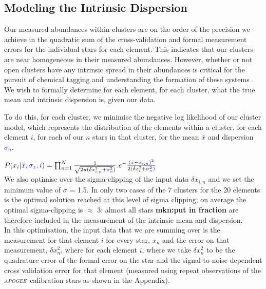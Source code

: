 \documentclass[14pt, preprint2]{aastex6}
\newcommand{\project}[1]{\textsl{#1}}
\newcommand{\apogee}{\project{\textsc{apogee}}}
\begin{document}
\subsection{Modeling the Intrinsic Dispersion}

Our measured abundances within clusters are on the order of the precision we achieve in the quadratic sum of the cross-validation and formal measurement errors for the individual stars for each element. This indicates that our clusters are near homogeneous in their measured abundances. However, whether or not open clusters have any intrinsic spread in their abundances is critical for the pursuit of chemical tagging and understanding the formation of these systems \citep[][]{Bovy2016, Lui2016}. We wish to formally determine for each element, for each cluster, what the true mean and intrinsic dispersion is, given our data. 

To do this, for each cluster, we minimise the negative log likelihood of our cluster model, which represents the distribution of the elements within a cluster, for each element $i$, for each of our $n$ stars in that cluster, for the mean \textcolor{blue}{$\bar{x}$} and dispersion \textcolor{blue}{$\sigma_n$}. 

$P({x_i} | \textcolor{blue}{\bar{x}, \sigma_x, i }) =  \prod_{n=1}^{N} \frac{1}{\sqrt{2 \pi (\delta x_{ \textcolor{blue}{i}, n} ^2 + \textcolor{blue}{{\sigma}_n^2}})} . e ^ - {\frac{\textcolor{blue}{(\bar{x}} - x_{\textcolor{blue}{i}, n})^2 }{2(\delta x_i^2 + \textcolor{blue}{\sigma_n^2)}}}$ \\

We also optimise over the sigma-clipping of the input data $\delta x_{i, n}$ and we set the minimum value of $\sigma$ = 1.5. In only two cases of the 7 clusters for the 20 elements is the optimal solution reached at this level of sigma clipping; on average the optimal sigma-clipping is $\approx$ 3: almost all stars \textbf{mkn:put in fraction} are therefore included in the measurement of the intrinsic mean and dispersion.\\



In this optimisation, the input data that we are summing over is the measurement for that element $i$ for every star, $x_n$  and the error on that measurement, $\delta x_n^2$, where for each element $i$, where we take $\delta x_n^2$ to be the quadrature error of the formal error on the star and the signal-to-noise dependent cross validation error for that element (measured using repeat observations of the \apogee\ calibration stars as shown in the Appendix). 
\end{document}
